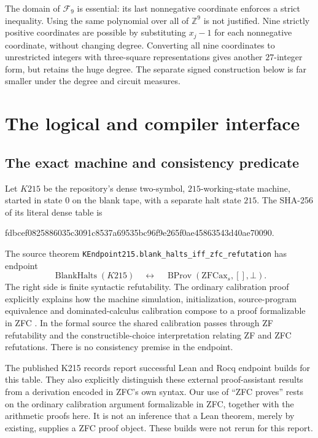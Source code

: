 \documentclass[11pt,a4paper]{article}
\theoremstyle{remark}
\newcommand{\ZZ}{\mathbb Z}
\newcommand{\ZFC}{\mathrm{ZFC}}
\begin{document}
The domain of $\mathcal F_9$ is essential: its last nonnegative coordinate
enforces a strict inequality.  Using the same polynomial over all of
$\ZZ^9$ is not justified.  Nine strictly positive coordinates are possible
by substituting $x_j-1$ for each nonnegative coordinate, without changing
degree.  Converting all nine coordinates to unrestricted integers with
three-square representations gives another $27$-integer form, but retains
the huge degree.  The separate signed construction below is far smaller
under the degree and circuit measures.

\section{The logical and compiler interface}
\label{sec:interface}

\subsection{The exact machine and consistency predicate}

Let $K215$ be the repository's dense two-symbol, $215$-working-state
machine, started in state $0$ on the blank tape, with a separate halt
state $215$.  The SHA-256 of its literal dense table is
\begin{center}\small\ttfamily
fdbcef0825886035c3091c8537a69535bc96f9e265f0ae45863543d40ae70090.
\end{center}
The source theorem
\texttt{KEndpoint215.blank\_halts\_iff\_zfc\_refutation} has endpoint
\[
 \operatorname{BlankHalts}(K215)\quad\longleftrightarrow\quad
 \operatorname{BProv}(\ZFC\mathrm{ax}_s,[],\bot).
\]
The right side is finite syntactic refutability.  The ordinary calibration
proof explicitly explains how the machine simulation, initialization,
source-program equivalence and dominated-calculus calibration compose
to a proof formalizable in ZFC \cite{k215ordinary,k215formal}.
In the formal source the shared calibration passes through ZF
refutability and the constructible-choice interpretation relating ZF
and ZFC refutations.  There is no consistency premise in the endpoint.

The published K215 records report successful Lean and Rocq endpoint
builds for this table.  They also explicitly distinguish these external
proof-assistant results from a derivation encoded in ZFC's own syntax.
Our use of ``ZFC proves'' rests on the ordinary calibration argument
formalizable in ZFC, together with the arithmetic proofs here.  It is
not an inference that a Lean theorem, merely by existing, supplies a
ZFC proof object.  These builds were not rerun for this report.
\end{document}
